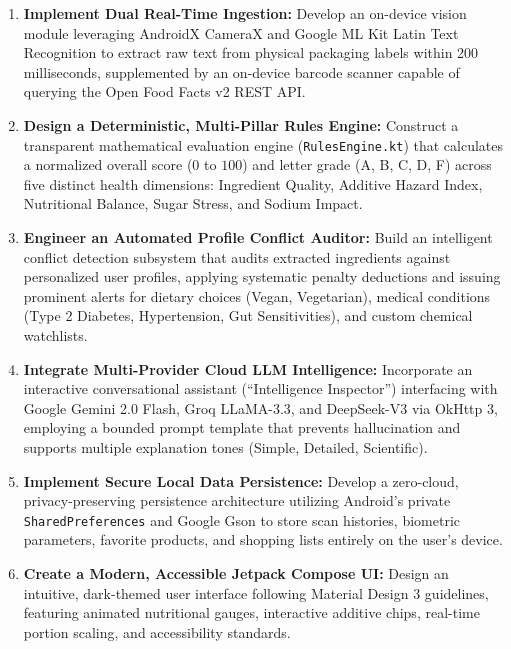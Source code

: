 \documentclass[12pt]{article}
\begin{document}
\begin{enumerate}
    \item \textbf{Implement Dual Real-Time Ingestion:}
    Develop an on-device vision module leveraging AndroidX CameraX and Google ML Kit Latin Text Recognition to extract raw text from physical packaging labels within 200 milliseconds, supplemented by an on-device barcode scanner capable of querying the Open Food Facts v2 REST API.
    
    \item \textbf{Design a Deterministic, Multi-Pillar Rules Engine:}
    Construct a transparent mathematical evaluation engine (\texttt{RulesEngine.kt}) that calculates a normalized overall score ($0$ to $100$) and letter grade (A, B, C, D, F) across five distinct health dimensions: Ingredient Quality, Additive Hazard Index, Nutritional Balance, Sugar Stress, and Sodium Impact.
    
    \item \textbf{Engineer an Automated Profile Conflict Auditor:}
    Build an intelligent conflict detection subsystem that audits extracted ingredients against personalized user profiles, applying systematic penalty deductions and issuing prominent alerts for dietary choices (Vegan, Vegetarian), medical conditions (Type 2 Diabetes, Hypertension, Gut Sensitivities), and custom chemical watchlists.
    
    \item \textbf{Integrate Multi-Provider Cloud LLM Intelligence:}
    Incorporate an interactive conversational assistant (``Intelligence Inspector'') interfacing with Google Gemini 2.0 Flash, Groq LLaMA-3.3, and DeepSeek-V3 via OkHttp 3, employing a bounded prompt template that prevents hallucination and supports multiple explanation tones (Simple, Detailed, Scientific).
    
    \item \textbf{Implement Secure Local Data Persistence:}
    Develop a zero-cloud, privacy-preserving persistence architecture utilizing Android's private \texttt{SharedPreferences} and Google Gson to store scan histories, biometric parameters, favorite products, and shopping lists entirely on the user's device.
    
    \item \textbf{Create a Modern, Accessible Jetpack Compose UI:}
    Design an intuitive, dark-themed user interface following Material Design 3 guidelines, featuring animated nutritional gauges, interactive additive chips, real-time portion scaling, and accessibility standards.
\end{enumerate}
\end{document}
